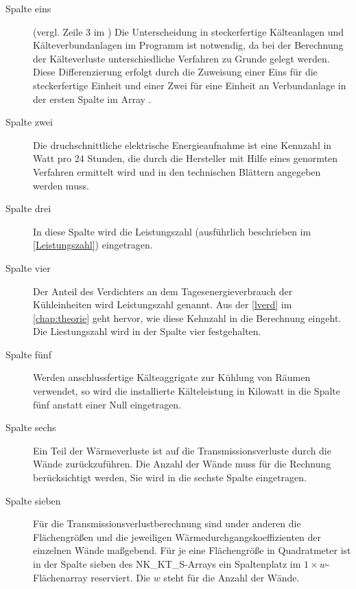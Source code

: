 \begin{description}

	\item [{Spalte eins}] (vergl. Zeile 3 im ) Die Unterscheidung in
	steckerfertige Kälteanlagen und Kälteverbundanlagen im Programm ist notwendig, da bei der Berechnung der
	Kälteverluste unterschiedliche Verfahren zu Grunde gelegt werden.  Diese
	Differenzierung erfolgt durch die Zuweisung einer Eins für die steckerfertige Einheit und einer Zwei für eine Einheit
	an Verbundanlage in der ersten Spalte im Array .

	\item [{Spalte zwei}] Die druchschnittliche elektrische Energieaufnahme ist eine Kennzahl in Watt pro 24 Stunden, die
	durch die Hersteller mit Hilfe eines genormten Verfahren ermittelt wird und in den technischen Blättern angegeben
	werden muss.

	\item [{Spalte drei}] In diese Spalte wird die Leistungszahl (ausführlich beschrieben im \cref{Leistungszahl})
	eingetragen.

	\item [{Spalte vier}] Der Anteil des Verdichters an dem Tagesenergieverbrauch der Kühleinheiten wird Leistungszahl
	genannt. Aus der \cref{lverd} im \cref{chap:theorie} geht hervor, wie diese Kehnzahl in die Berechnung eingeht. Die
	Liestungszahl wird in der Spalte vier festgehalten.

	\item [{Spalte fünf}] Werden anschlussfertige Kälteaggrigate zur Kühlung von Räumen verwendet, so wird die
	installierte Kälteleistung in Kilowatt in die Spalte fünf anstatt einer Null eingetragen.

	\item [{Spalte sechs}] Ein Teil der Wärmeverluste ist auf die Transmissionsverluste durch die Wände zurückzuführen.
	Die Anzahl der Wände muss für die Rechnung berücksichtigt werden, Sie wird in die sechste Spalte eingetragen.
	
	\item [{Spalte sieben}] Für die Transmissionsverlustberechnung sind under anderen die Flächengrößen und die jeweiligen
	Wärmedurchgangskoeffizienten der einzelnen Wände maßgebend. Für je eine Flächengröße in Quadratmeter ist in
	der Spalte sieben des NK\_KT\_S-Arrays ein Spaltenplatz im $1\times w$-Flächenarray reserviert. Die $w$ steht für die
	Anzahl der Wände.


\end{description}
